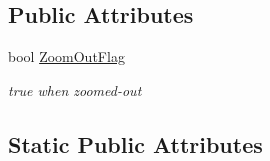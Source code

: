 \subsection*{Public Attributes}
\begin{DoxyCompactItemize}
\item 
\mbox{\label{class_t_display_a0ce29cc370b43313ff15bee9423bf338}} 
bool \mbox{\hyperlink{class_t_display_a0ce29cc370b43313ff15bee9423bf338}{Zoom\+Out\+Flag}}
\begin{DoxyCompactList}\small\item\em true when zoomed-\/out \end{DoxyCompactList}\end{DoxyCompactItemize}
\subsection*{Static Public Attributes}
